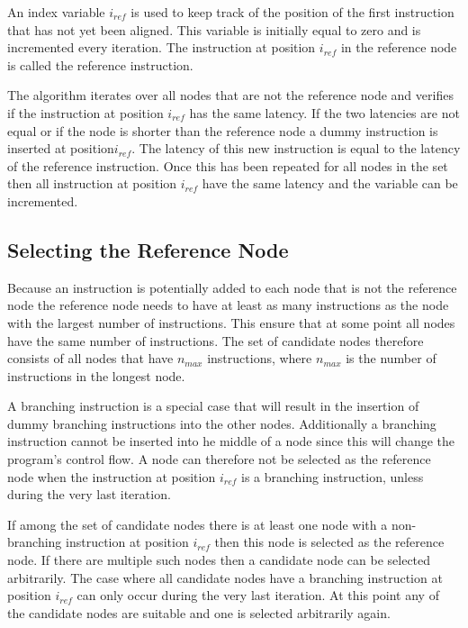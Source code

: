 An index variable $i_{ref}$ is used to keep track of the position of the first instruction that has not yet been aligned. This variable is initially equal to zero and is incremented every iteration. 
The instruction at position $i_{ref}$ in the reference node is called the reference instruction.

The algorithm iterates over all nodes that are not the reference node and verifies if the instruction at position $i_{ref}$ has the same latency. 
If the two latencies are not equal or if the node is shorter than the reference node a dummy instruction is inserted at position$i_{ref}$. 
The latency of this new instruction is equal to the latency of the reference instruction. 
Once this has been repeated for all nodes in the set then all instruction at position $i_{ref}$ have the same latency and the variable can be incremented. 


\subsection{Selecting the Reference Node}
Because an instruction is potentially added to each node that is not the reference node the reference node needs to have at least as many instructions as the node with the largest number of instructions. 
This ensure that at some point all nodes have the same number of instructions. 
The set of candidate nodes therefore consists of all nodes that have $n_{max}$ instructions, where $n_{max}$ is the number of instructions in the longest node. 

A branching instruction is a special case that will result in the insertion of dummy branching instructions into the other nodes. 
Additionally a branching instruction cannot be inserted into he middle of a node since this will change the program's control flow. 
A node can therefore not be selected as the reference node when the instruction at position $i_{ref}$ is a branching instruction, unless during the very last iteration.

If among the set of candidate nodes there is at least one node with a non-branching instruction at position $i_{ref}$ then this node is selected as the reference node. 
If there are multiple such nodes then a candidate node can be selected arbitrarily. 
The case where all candidate nodes have a branching instruction at position $i_{ref}$ can only occur during the very last iteration. 
At this point any of the candidate nodes are suitable and one is selected arbitrarily again. 

